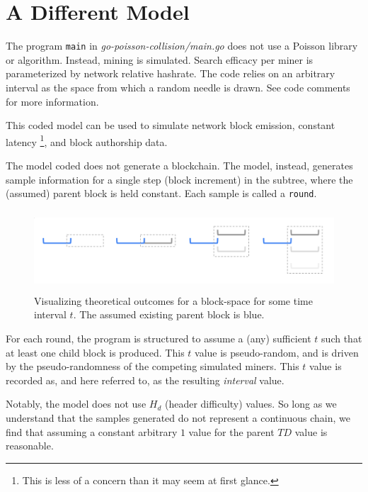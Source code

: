 \documentclass[11pt]{article}
\theoremstyle{plain}
\begin{document}
\section{\normalsize{A Different Model}}

The program \texttt{main} in \textit{go-poisson-collision/main.go} does not use
a Poisson library or algorithm.
Instead, mining is simulated.
Search efficacy per miner is parameterized by network relative hashrate.
The code relies on an arbitrary interval as the space from which a random needle
is drawn. See code comments for more information.

This coded model can be used to simulate network block emission, constant latency\nolinebreak
\footnote{This is less of a concern than it may seem at first glance.}, and
block authorship data.

The model coded does not generate a blockchain. The model, instead,
generates sample information for a single step (block increment)
in the subtree, where the (assumed) parent block is held constant.
Each sample is called a \texttt{round}.

\begin{figure}[tph]
    \centering
    \includegraphics[height=3cm]{vis_theoretical_block-space.png}
    \caption{
        Visualizing theoretical outcomes for a block-space for some time interval
        $t$. The assumed existing parent block is blue.
    }
\end{figure}

For each round, the program is structured to assume a (any) sufficient $t$ such
that at least one child block is produced. This $t$ value is pseudo-random, and
is driven by the pseudo-randomness of the competing simulated miners.
This $t$ value is recorded as, and here referred to, as the resulting
\textit{interval} value.

Notably, the model does not use $H_d$ (header difficulty) values.
So long as we understand that the samples generated do not represent a continuous
chain, we find that assuming a constant arbitrary $1$ value for the
parent $TD$ value is reasonable.
\end{document}
